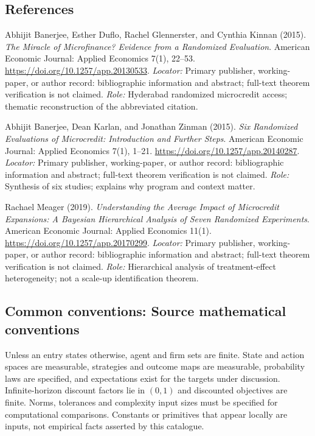 \documentclass[11pt,a4paper]{article}
\begin{document}
\subsection*{References}
\begin{enumerate}[label=\textnormal{[S\arabic*]},leftmargin=*]
\item Abhijit Banerjee, Esther Duflo, Rachel Glennerster, and Cynthia Kinnan (2015). \emph{The Miracle of Microfinance? Evidence from a Randomized Evaluation}. American Economic Journal: Applied Economics 7(1), 22--53. \url{https://doi.org/10.1257/app.20130533}. \textit{Locator:} Primary publisher, working-paper, or author record: bibliographic information and abstract; full-text theorem verification is not claimed. \textit{Role:} Hyderabad randomized microcredit access; thematic reconstruction of the abbreviated citation.
\item Abhijit Banerjee, Dean Karlan, and Jonathan Zinman (2015). \emph{Six Randomized Evaluations of Microcredit: Introduction and Further Steps}. American Economic Journal: Applied Economics 7(1), 1--21. \url{https://doi.org/10.1257/app.20140287}. \textit{Locator:} Primary publisher, working-paper, or author record: bibliographic information and abstract; full-text theorem verification is not claimed. \textit{Role:} Synthesis of six studies; explains why program and context matter.
\item Rachael Meager (2019). \emph{Understanding the Average Impact of Microcredit Expansions: A Bayesian Hierarchical Analysis of Seven Randomized Experiments}. American Economic Journal: Applied Economics 11(1). \url{https://doi.org/10.1257/app.20170299}. \textit{Locator:} Primary publisher, working-paper, or author record: bibliographic information and abstract; full-text theorem verification is not claimed. \textit{Role:} Hierarchical analysis of treatment-effect heterogeneity; not a scale-up identification theorem.
\end{enumerate}

\subsection*{Common conventions: Source mathematical conventions}

Unless an entry states otherwise, agent and firm sets are finite. State and action spaces are measurable, strategies and outcome maps are measurable, probability laws are specified, and expectations exist for the targets under discussion. Infinite-horizon discount factors lie in $(0,1)$ and discounted objectives are finite. Norms, tolerances and complexity input sizes must be specified for computational comparisons. Constants or primitives that appear locally are inputs, not empirical facts asserted by this catalogue.
\end{document}
